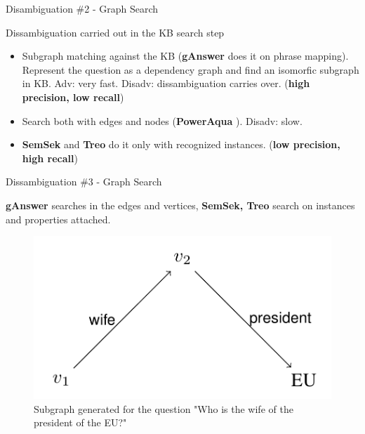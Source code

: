 \documentclass{beamer}
\begin{document}

\begin{frame}{Disambiguation \#2 - Graph Search}
  \begin{card}
    Dissambiguation carried out in the KB search step
    \begin{itemize}
      \item Subgraph matching against the KB (\textbf{gAnswer} \cite{zou2014a} does it on phrase mapping). Represent the question as a dependency graph and find an isomorfic subgraph in KB. Adv: very fast. Disadv: dissambiguation carries over. (\textbf{high precision, low recall})
      \item Search both with edges and nodes (\textbf{PowerAqua} \cite{lopez2012a}). Disadv: slow.
      \item \textbf{SemSek} \cite{aggarwal2012a} and \textbf{Treo} \cite{freitas2014a} do it only with recognized instances. (\textbf{low precision, high recall})
    \end{itemize}
  \end{card}
\end{frame}


\begin{frame}{Dissambiguation \#3 - Graph Search}
  \begin{cardTiny}
    \textbf{gAnswer} searches in the edges and vertices, \textbf{SemSek, Treo} search on instances and properties attached.
    \begin{figure}\label{fig:subgraph}
      \centering
      \includegraphics[height=0.45\textheight]{./res/subgraph.png}
      \caption{Subgraph generated for the question "Who is the wife of the president of the EU?"}
    \end{figure}
  \end{cardTiny}
\end{frame}
\end{document}
